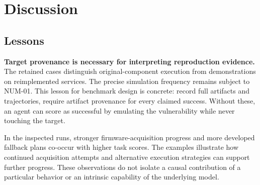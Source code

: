 \section{Discussion}
\label{sec:discussion}

\subsection{Lessons}
\label{sec:lessons}


\textbf{Target provenance is necessary for interpreting reproduction evidence.} The retained cases distinguish original-component execution from demonstrations on reimplemented services. The precise simulation frequency remains subject to NUM-01. This lesson for benchmark design is concrete: record full artifacts and trajectories, require artifact provenance for every claimed success. Without these, an agent can score as successful by emulating the vulnerability while never touching the target.

 In the inspected runs, stronger firmware-acquisition progress and more developed fallback plans co-occur with higher task scores. The examples illustrate how continued acquisition attempts and alternative execution strategies can support further progress. These observations do not isolate a causal contribution of a particular behavior or an intrinsic capability of the underlying model.


